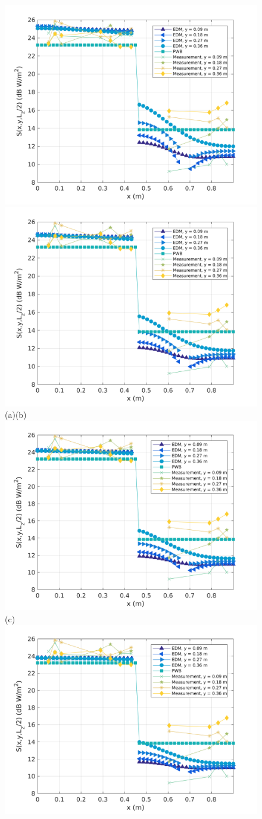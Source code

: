 \documentclass[a4paper]{article}
\numberwithin{equation}{section}
\begin{document}
\begin{figure}[hp]
\begin{center}
\includegraphics[width=0.49\linewidth]{figures/DDM-EEBC_3D_DL_PowerDensityProfileXMeas_JX_k0_5}
\includegraphics[width=0.49\linewidth]{figures/DDM-EEBC_3D_DL_PowerDensityProfileXMeas_JX_k0_75}\\
{\footnotesize (a)\hspace{75mm}(b)}\\
\includegraphics[width=0.5\linewidth]{figures/DDM-EEBC_3D_DL_PowerDensityProfileXMeas_JX_k1_0}\\
{\footnotesize (c)}\\
\includegraphics[width=0.49\linewidth]{figures/DDM-EEBC_3D_DL_PowerDensityProfileXMeas_JX_k1_5}

\end{center}
\end{figure}
\end{document}
